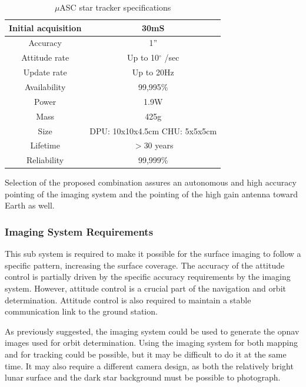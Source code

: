 \begin{table}[htb!]
  \centering
    \begin{tabular}{|r|c|}
    \hline
    Initial acquisition & 30mS \bigstrut\\
    \hline
    \multicolumn{1}{|c|}{Accuracy} & 1” \bigstrut\\
    \hline
    \multicolumn{1}{|c|}{Attitude rate} & Up to 10$^{\circ}$ /sec \bigstrut\\
    \hline
    \multicolumn{1}{|c|}{Update rate} & Up to 20Hz \bigstrut\\
    \hline
    \multicolumn{1}{|c|}{Availability} & 99,995\% \bigstrut\\
    \hline
    \multicolumn{1}{|c|}{Power} & 1.9W \bigstrut\\
    \hline
    \multicolumn{1}{|c|}{Mass} & 425g \bigstrut\\
    \hline
    \multicolumn{1}{|c|}{Size} & DPU: 10x10x4.5cm CHU: 5x5x5cm \bigstrut\\
    \hline
    \multicolumn{1}{|c|}{Lifetime} & $>$30 years \bigstrut\\
    \hline
    \multicolumn{1}{|c|}{Reliability} & 99,999\% \bigstrut\\
    \hline
    \end{tabular}%
    \caption{$\mu$ASC star tracker specifications \cite {masc}}
  \label{tab:masc}%
\end{table}%
Selection of the proposed combination assures an autonomous and high accuracy pointing of the imaging system and the pointing of the high gain antenna toward Earth as well. 
\subsubsection*{Imaging System Requirements}
This sub system is required to make it possible for the surface imaging to follow a specific pattern, increasing the surface coverage. The accuracy of the attitude control is partially driven by the specific accuracy requirements by the imaging system. However, attitude control is a crucial part of the navigation and orbit determination. Attitude control is also required to maintain a stable communication link to the ground station. 

As previously suggested, the imaging system could be used to generate the opnav images used for orbit determination. Using the imaging system for both mapping and for tracking could be possible, but it may be difficult to do it at the same time. It may also require a different camera design, as both the relatively bright lunar surface and the dark star background must be possible to photograph.

